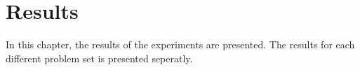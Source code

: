 \chapter{Results}
\label{sec:results}
In this chapter, the results of the experiments are presented. The results for each different problem set is presented seperatly.





